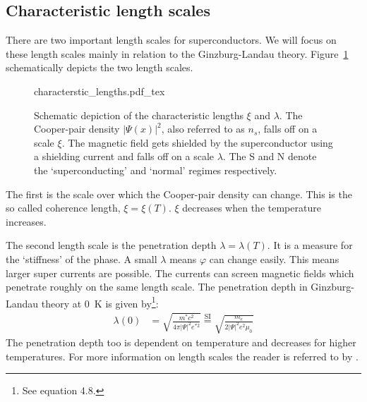 \subsection{Characteristic length scales}
\label{sec:characteristic-length-scales}
There are two important length scales for superconductors. We will focus on these length scales mainly in relation to the Ginzburg-Landau theory.  Figure~\ref{fig:characteristic-lengths} schematically depicts the two length scales.

\begin{figure}[ht!]
	\centering
	\def\svgwidth{\textwidth}
	{characterstic_lengths.pdf_tex}
	\caption{Schematic depiction of the characteristic lengths $\xi$ and $\lambda$. The Cooper-pair density $|\Psi(x)|^2$, also referred to as $n_s$, falls off on a scale $\xi$. The magnetic field gets shielded by the superconductor using a shielding current and falls off on a scale $\lambda$. The S and N denote the `superconducting' and `normal' regimes respectively.}
	\label{fig:characteristic-lengths}
\end{figure}

The first is the scale over which the Cooper-pair density can change. This is the so called coherence length, $\xi = \xi(T)$. $\xi$ decreases when the temperature increases.\cite{tinkhamIntroductionSuperconductivity}

The second length scale is the penetration depth $\lambda=\lambda(T)$. It is a measure for the `stiffness' of the phase. A small $\lambda$ means $\varphi$ can change easily. This means larger super currents are possible. The currents can screen magnetic fields which penetrate roughly on the same length scale. The penetration depth in Ginzburg-Landau theory at \qty{0}{\kelvin} is given by\footnote{See  equation 4.8.}:
\begin{align}
	\lambda(0) &= \sqrt{\frac{m^*c^2}{4\pi|\Psi|^2e^{*2}}} \stackrel{\text{SI}}{=} \sqrt{\frac{m_e}{2|\Psi|^2e^2\mu_0}}
	\label{eqn:london-penetration-depth}
\end{align}
The penetration depth too is dependent on temperature and decreases for higher temperatures. For more information on length scales the reader is referred to  by \citeauthor{tinkhamIntroductionSuperconductivity}.

